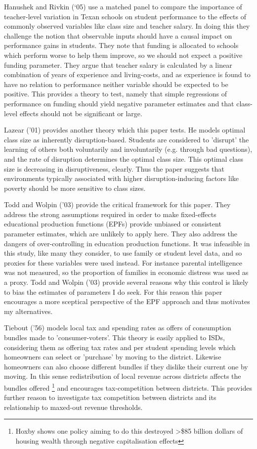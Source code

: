 \documentclass[11pt]{article}
\begin{document}
Hanushek and Rivkin (‘05) use a matched panel to compare the importance of teacher-level variation in Texan schools on student performance to the effects of commonly observed variables like class size and teacher salary. In doing this they challenge the notion that observable inputs should have a causal impact on performance gains in students. They note that funding is allocated to schools which perform worse to help them improve, so we should not expect a positive funding parameter. They argue that teacher salary is calculated by a linear combination of years of experience and living-costs, and as experience is found to have no relation to performance neither variable should be expected to be positive. This provides a theory to test, namely that simple regressions of performance on funding should yield negative parameter estimates and that class-level effects should not be significant or large. 

Lazear ('01) provides another theory which this paper tests. He models optimal class size as inherently disruption-based. Students are considered to 'disrupt' the learning of others both voluntarily and involuntarily (e.g. through bad questions), and the rate of disruption determines the optimal class size. This optimal class size is decreasing in disruptiveness, clearly. Thus the paper suggests that environments typically associated  with higher disruption-inducing factors like poverty should be more sensitive to class sizes.

Todd and Wolpin ('03) provide the critical framework for this paper. They address the strong assumptions required in order to make fixed-effects educational production functions (EPFs) provide unbiased or consistent parameter estimates, which are unlikely to apply here. They also address the dangers of over-controlling in education production functions. It was infeasible in this study, like many they consider, to use family or student level data, and so proxies for these variables were used instead. For instance parental intelligence was not measured, so the proportion of families in economic distress was used as a proxy. Todd and Wolpin ('03) provide several reasons why this control is likely to bias the estimates of parameters I do seek. For this reason this paper encourages a more sceptical perspective of the EPF approach and thus motivates my alternatives. 

Tiebout ('56) models local tax and spending rates as offers of consumption bundles made to 'consumer-voters'. This theory is easily applied to ISDs, considering them as offering tax rates and per student spending levels which homeowners can select or 'purchase' by moving to the district. Likewise homeowners can also choose different bundles if they dislike their current one by moving. In this sense redistribution of local revenue across districts affects the bundles offered \footnote{Hoxby shows one policy aiming to do this destroyed \textgreater\$85 billion dollars of housing wealth through negative capitalisation effects} and encourages tax-competition between districts. This provides further reason to investigate tax competition between districts and its relationship to maxed-out revenue thresholds.
\end{document}
